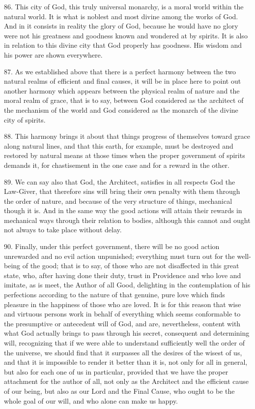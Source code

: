 86. This city of God, this truly universal monarchy, is a moral world
within the natural world. It is what is noblest and most divine among
the works of God. And in it consists in reality the glory of God,
because he would have no glory were not his greatness and goodness
known and wondered at by spirits. It is also in relation to this
divine city that God properly has goodness. His wisdom and his power
are shown everywhere.

87. As we established above that there is a perfect harmony between
the two natural realms of efficient and final causes, it will be in
place here to point out another harmony which appears between the
physical realm of nature and the moral realm of grace, that is to say,
between God considered as the architect of the mechanism of the world
and God considered as the monarch of the divine city of spirits.

88. This harmony brings it about that things progress of themselves
toward grace along natural lines, and that this earth, for example,
must be destroyed and restored by natural means at those times when
the proper government of spirits demands it, for chastisement in the
one case and for a reward in the other.

89. We can say also that God, the Architect, satisfies in all respects
God the Law-Giver, that therefore  sins will bring their own
penalty with them through the order of nature, and because of the very
structure of things, mechanical though it is. And in the same way the
good actions will attain their rewards in mechanical ways through
their relation to bodies, although this cannot and ought not always to
take place without delay.

90. Finally, under this perfect government, there will be no good
action unrewarded and no evil action unpunished; everything must turn
out for the well-being of the good; that is to say, of those who are
not disaffected in this great state, who, after having done their
duty, trust in Providence and who love and imitate, as is meet, the
Author of all Good, delighting in the contemplation of his perfections
according to the nature of that genuine, pure love which finds
pleasure in the happiness of those who are loved. It is for this
reason that wise and virtuous persons work in behalf of everything
which seems conformable to the presumptive or antecedent will of God,
and are, nevertheless, content with what God actually brings to pass
through his secret, consequent and determining will, recognizing that
if we were able to understand sufficiently well the order of the
universe, we should find that it surpasses all the desires of the
wisest of us, and that it is impossible to render it better than it
is, not only for all in general, but also for each one of us in
particular, provided that we have the proper attachment for the author
of all, not only as the Architect and the efficient cause of our
being, but also as our Lord and the Final Cause, who ought to be the
whole goal of our will, and who alone can make us happy.

